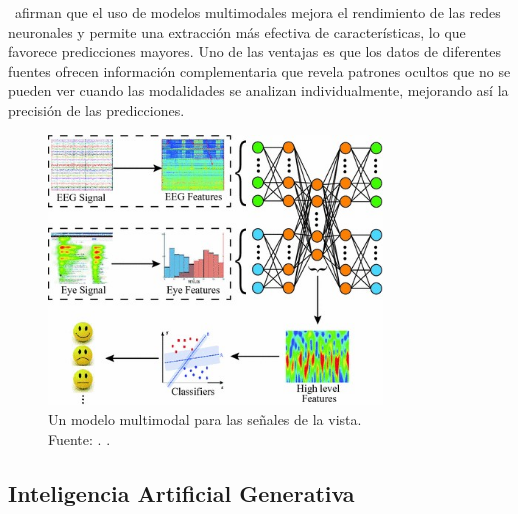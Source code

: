 \cite{tec_baheti2020introduction_mdl} afirman que el uso de modelos multimodales mejora el rendimiento de las redes neuronales y permite una extracción más efectiva de características, lo que favorece predicciones mayores. Uno de las ventajas es que los datos de diferentes fuentes ofrecen información complementaria que revela patrones ocultos que no se pueden ver cuando las modalidades se analizan individualmente, mejorando así la precisión de las predicciones.

\begin{figure}[!ht]
	\begin{center}
		\includegraphics[width=0.79\textwidth]{2/figures/multimodal_deep_learning_example.jpg}
		\caption[Un modelo multimodal para las señales de la vista]{Un modelo multimodal para las señales de la vista.\\
		Fuente: \cite{tec_baheti2020introduction_mdl}. .}
		\label{2:fig7}
	\end{center}
\end{figure}

\subsection{Inteligencia Artificial Generativa}

